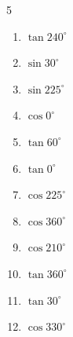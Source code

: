 \begin{multicols}{5}
\begin{enumerate}

  \item $\displaystyle \tan{240^\circ}$


  \item $\displaystyle \sin{30^\circ}$


  \item $\displaystyle \sin{225^\circ}$


  \item $\displaystyle \cos{0^\circ}$

        \phantom{$\displaystyle =1$}

  \item $\displaystyle \tan{60^\circ}$


  \item $\displaystyle \tan{0^\circ}$

        \phantom{$\displaystyle =0$}

  \item $\displaystyle \cos{225^\circ}$


  \item $\displaystyle \cos{360^\circ}$

        \phantom{$\displaystyle =1$}

  \item $\displaystyle \cos{210^\circ}$


  \item $\displaystyle \tan{360^\circ}$

        \phantom{$\displaystyle =0$}

  \item $\displaystyle \tan{30^\circ}$


  \item $\displaystyle \cos{330^\circ}$


\columnbreak %


\end{enumerate}
\end{multicols}
